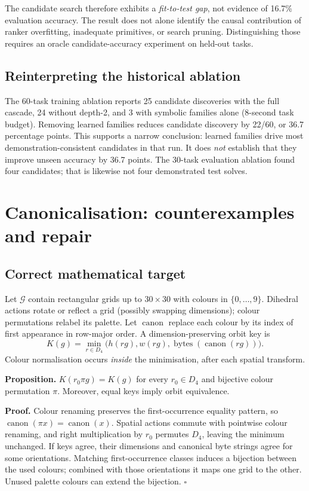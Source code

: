 \documentclass[10pt,a4paper]{article}
\begin{document}
The candidate search therefore exhibits a \emph{fit-to-test gap}, not evidence of 16.7\% evaluation accuracy. The result does not alone identify the causal contribution of ranker overfitting, inadequate primitives, or search pruning. Distinguishing those requires an oracle candidate-accuracy experiment on held-out tasks.

\subsection{Reinterpreting the historical ablation}
The 60-task training ablation reports 25 candidate discoveries with the full cascade, 24 without depth-2, and 3 with symbolic families alone (8-second task budget). Removing learned families reduces candidate discovery by 22/60, or 36.7 percentage points. This supports a narrow conclusion: learned families drive most demonstration-consistent candidates in that run. It does \emph{not} establish that they improve unseen accuracy by 36.7 points. The 30-task evaluation ablation found four candidates; that is likewise not four demonstrated test solves.

\section{Canonicalisation: counterexamples and repair}
\subsection{Correct mathematical target}
Let $\mathcal G$ contain rectangular grids up to $30\times30$ with colours in $\{0,\ldots,9\}$. Dihedral actions rotate or reflect a grid (possibly swapping dimensions); colour permutations relabel its palette. Let $\operatorname{canon}$ replace each colour by its index of first appearance in row-major order. A dimension-preserving orbit key is
\begin{equation}
K(g)=\min_{r\in D_4}\bigl(h(rg),w(rg),\operatorname{bytes}(\operatorname{canon}(rg))\bigr).
\label{eq:key}
\end{equation}
Colour normalisation occurs \emph{inside} the minimisation, after each spatial transform.

\textbf{Proposition.} $K(r_0\pi g)=K(g)$ for every $r_0\in D_4$ and bijective colour permutation $\pi$. Moreover, equal keys imply orbit equivalence.

\textbf{Proof.} Colour renaming preserves the first-occurrence equality pattern, so $\operatorname{canon}(\pi x)=\operatorname{canon}(x)$. Spatial actions commute with pointwise colour renaming, and right multiplication by $r_0$ permutes $D_4$, leaving the minimum unchanged. If keys agree, their dimensions and canonical byte strings agree for some orientations. Matching first-occurrence classes induces a bijection between the used colours; combined with those orientations it maps one grid to the other. Unused palette colours can extend the bijection. $\square$
\end{document}
